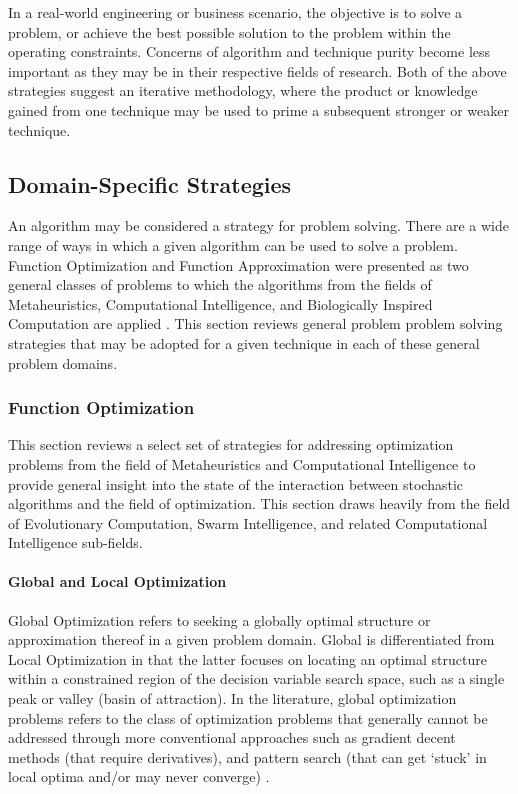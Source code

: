 In a real-world engineering or business scenario, the objective is to solve a problem, or achieve the best possible solution to the problem within the operating constraints.
Concerns of algorithm and technique purity become less important as they may be in their respective fields of research.
Both of the above strategies suggest an iterative methodology, where the product or knowledge gained from one technique may be used to prime a subsequent stronger or weaker technique. 

%
%
\subsection{Domain-Specific Strategies}
\label{sec:strategies}
An algorithm may be considered a strategy for problem solving. There are a wide range of ways in which a given algorithm can be used to solve a problem. 
Function Optimization and Function Approximation were presented as two general classes of problems to which the algorithms from the fields of Metaheuristics, Computational Intelligence, and Biologically Inspired Computation are applied \cite{Brownlee2010n}. 
This section reviews general problem problem solving strategies that may be adopted for a given technique in each of these general problem domains.

%
%
\subsubsection{Function Optimization}
This section reviews a select set of strategies for addressing optimization problems from the field of Metaheuristics and Computational Intelligence to provide general insight into the state of the interaction between stochastic algorithms and the field of optimization. This section draws heavily from the field of Evolutionary Computation, Swarm Intelligence, and related Computational Intelligence sub-fields.
	
\paragraph{Global and Local Optimization}
Global Optimization refers to seeking a globally optimal structure or approximation thereof in a given problem domain. Global is differentiated from Local Optimization in that the latter focuses on locating an optimal structure within a constrained region of the decision variable search space, such as a single peak or valley (basin of attraction). In the literature, global optimization problems refers to the class of optimization problems that generally cannot be addressed through more conventional approaches such as gradient decent methods (that require derivatives), and pattern search (that can get `stuck' in local optima and/or may never converge) \cite{Price1977, Toern1999}. 

